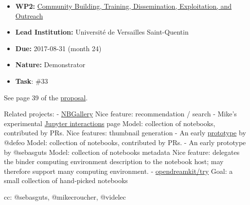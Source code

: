 \begin{itemize}
\tightlist
\item
  \textbf{WP2:}
  \href{https://github.com/OpenDreamKit/OpenDreamKit/tree/master/WP2}{Community
  Building, Training, Dissemination, Exploitation, and Outreach}
\item
  \textbf{Lead Institution:} Université de Versailles Saint-Quentin
\item
  \textbf{Due:} 2017-08-31 (month 24)
\item
  \textbf{Nature:} Demonstrator
\item
  \textbf{Task}: \#33
\end{itemize}

See page 39 of the
\href{https://github.com/OpenDreamKit/OpenDreamKit/raw/master/Proposal/proposal-www.pdf}{proposal}.

Related projects: - \href{https://nbgallery.github.io/}{NBGallery} Nice
feature: recommendation / search - Mike's experimental
\href{https://mikecroucher.github.io/jupyter-interactions/}{Jupyter
interactions} page Model: collection of notebooks, contributed by PRs.
Nice features: thumbnail generation - An early
\href{https://defeo.lu/jupyter/}{prototype} by @defeo Model: collection
of notebooks, contributed by PRs. - An early prototype by @sebasguts
Model: collection of notebooks metadata Nice feature: delegates the
binder computing environment description to the notebook host; may
therefore support many computing environment. -
\href{https://github.com/OpenDreamKit/OpenDreamKit.github.io/issues/73}{opendreamkit/try}
Goal: a small collection of hand-picked notebooks

cc: @sebasguts, @mikecroucher, @videlec
